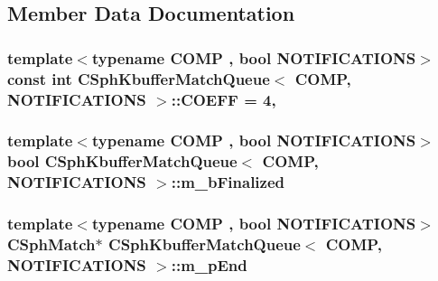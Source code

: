 \subsection{Member Data Documentation}
\hypertarget{classCSphKbufferMatchQueue_a56d11f79a272bbce8419a3bcff551301}{
\subsubsection[{C\-O\-E\-F\-F}]{\setlength{\rightskip}{0pt plus 5cm}template$<$typename C\-O\-M\-P , bool N\-O\-T\-I\-F\-I\-C\-A\-T\-I\-O\-N\-S$>$ const {\bf int} {\bf C\-Sph\-Kbuffer\-Match\-Queue}$<$ C\-O\-M\-P, N\-O\-T\-I\-F\-I\-C\-A\-T\-I\-O\-N\-S $>$\-::C\-O\-E\-F\-F = 4\hspace{0.3cm}{\ttfamily [static]}, {\ttfamily [protected]}}}\label{classCSphKbufferMatchQueue_a56d11f79a272bbce8419a3bcff551301}
\hypertarget{classCSphKbufferMatchQueue_aa0449599deac04791508a3e12a4af20b}{
\subsubsection[{m\-\_\-b\-Finalized}]{\setlength{\rightskip}{0pt plus 5cm}template$<$typename C\-O\-M\-P , bool N\-O\-T\-I\-F\-I\-C\-A\-T\-I\-O\-N\-S$>$ bool {\bf C\-Sph\-Kbuffer\-Match\-Queue}$<$ C\-O\-M\-P, N\-O\-T\-I\-F\-I\-C\-A\-T\-I\-O\-N\-S $>$\-::m\-\_\-b\-Finalized\hspace{0.3cm}{\ttfamily [protected]}}}\label{classCSphKbufferMatchQueue_aa0449599deac04791508a3e12a4af20b}
\hypertarget{classCSphKbufferMatchQueue_a6f72185e0462dabeb2d6c608149e374d}{
\subsubsection[{m\-\_\-p\-End}]{\setlength{\rightskip}{0pt plus 5cm}template$<$typename C\-O\-M\-P , bool N\-O\-T\-I\-F\-I\-C\-A\-T\-I\-O\-N\-S$>$ {\bf C\-Sph\-Match}$\ast$ {\bf C\-Sph\-Kbuffer\-Match\-Queue}$<$ C\-O\-M\-P, N\-O\-T\-I\-F\-I\-C\-A\-T\-I\-O\-N\-S $>$\-::m\-\_\-p\-End\hspace{0.3cm}{\ttfamily [protected]}}}\label{classCSphKbufferMatchQueue_a6f72185e0462dabeb2d6c608149e374d}
